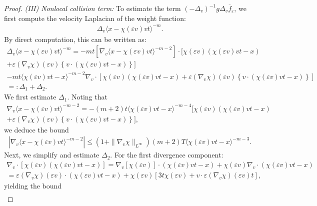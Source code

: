 \documentclass[10pt,a4paper]{amsart}
\begin{document}
\begin{proof}
\noindent \textit{(III) Nonlocal collision term:} To estimate the term $(-\Delta_v)^{-1}g\Delta_v\overline{f}_\varepsilon$, we first compute the velocity Laplacian of the weight function:
\begin{align*}
\Delta_v\langle x-\chi(\varepsilon v)vt\rangle^{-m}.
\end{align*}By direct computation, this can be written as:
\begin{multline*}
\Delta_v\langle x-\chi(\varepsilon v)vt\rangle^{-m} 
= -mt\left[\nabla_v\langle x-\chi(\varepsilon v)vt\rangle^{-m-2}\right]\cdot [\chi(\varepsilon v)(\chi(\varepsilon v)vt - x) \\
+\varepsilon(\nabla_v\chi)(\varepsilon v) \left\{v\cdot(\chi(\varepsilon v)vt -x)\right\} ] \\
- mt \langle \chi(\varepsilon v)vt - x\rangle^{-m-2}\nabla_v\cdot\left[\chi(\varepsilon v)(\chi(\varepsilon v)vt - x) + \varepsilon(\nabla_v\chi)(\varepsilon v) \left\{v\cdot(\chi(\varepsilon v)vt -x)\right\}\right]\\
=: \Delta_1 + \Delta_2.
\end{multline*}We first estimate $\Delta_1$. Noting that
\begin{multline*}
\nabla_v\langle x-\chi(\varepsilon v)vt\rangle^{-m-2} = -(m+2)t \langle \chi(\varepsilon v) vt - x\rangle^{-m-4}[\chi(\varepsilon v)(\chi(\varepsilon v)vt - x) \\
+ \varepsilon(\nabla_v\chi)(\varepsilon v)\left\{v\cdot(\chi(\varepsilon v)vt - x)\right\}],
\end{multline*}we deduce the bound
\begin{align}\label{Delta 1}
|\nabla_v\langle x-\chi(\varepsilon v)vt\rangle^{-m-2}| \le (1+\|\nabla_v\chi\|_{L^\infty})(m+2)T\langle \chi(\varepsilon v)vt - x\rangle^{-m-3}.
\end{align}Next, we simplify and estimate $\Delta_2$. For the first divergence component:
\begin{multline*}
\nabla_v\cdot\left[\chi(\varepsilon v)(\chi(\varepsilon v)vt - x)\right]
=\nabla_v\left[\chi(\varepsilon v)\right]\cdot(\chi(\varepsilon v)vt - x) + \chi(\varepsilon v)\nabla_v\cdot(\chi(\varepsilon v) vt - x)\\
= \varepsilon(\nabla_v\chi)(\varepsilon v)\cdot (\chi(\varepsilon v)vt - x) + \chi(\varepsilon v)\left[3t\chi(\varepsilon v) + v\cdot\varepsilon (\nabla_v\chi)(\varepsilon v)t\right],
\end{multline*}yielding the bound
\begin{align}\label{Delta 2-1}

\end{align}
\end{proof}
\end{document}
